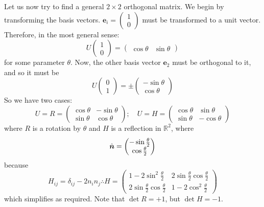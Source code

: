 \documentclass{article}
\begin{document}
	Let us now try to find a general $2 \times 2$ orthogonal matrix. We begin by transforming the basis vectors. $\bm e_i = \begin{pmatrix} 1 \\ 0 \end{pmatrix}$ must be transformed to a unit vector. Therefore, in the most general sense:
	\[ U \begin{pmatrix}
		1 \\0
	\end{pmatrix} = \begin{pmatrix}
		\cos \theta & \sin \theta
	\end{pmatrix} \]
	for some parameter $\theta$. Now, the other basis vector $\bm e_2$ must be orthogonal to it, and so it must be
	\[
		U \begin{pmatrix}
			0 \\ 1
		\end{pmatrix} = \pm\begin{pmatrix}
			-\sin \theta \\
			\cos \theta
		\end{pmatrix}
	\]
	So we have two cases:
	\[ U = R = \begin{pmatrix}
		\cos \theta & -\sin\theta \\ \sin \theta & \cos \theta
	\end{pmatrix};\quad U = H = \begin{pmatrix}
		\cos \theta & \sin \theta \\ \sin \theta & -\cos \theta
	\end{pmatrix} \]
	where $R$ is a rotation by $\theta$ and $H$ is a reflection in $\mathbb R^2$, where
	\[ \hat{\bm n} = \begin{pmatrix}
		-\sin \frac{\theta}{2} \\ \cos \frac{\theta}{2}
	\end{pmatrix} \]
	because
	\[ H_{ij} = \delta_{ij} - 2n_in_j \therefore H = \begin{pmatrix}
		1 - 2 \sin^2 \frac{\theta}{2} & 2\sin\frac{\theta}{2}\cos\frac{\theta}{2} \\
		2\sin\frac{\theta}{2} \cos\frac{\theta}{2} & 1-2\cos^2\frac{\theta}{2}
	\end{pmatrix} \]
	which simplifies as required. Note that $\det R = +1$, but $\det H = -1$.
\end{document}
